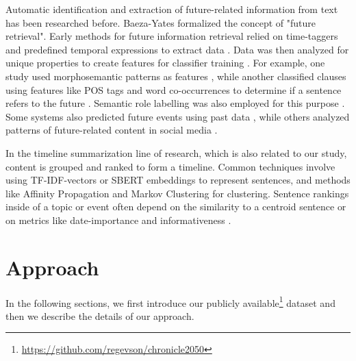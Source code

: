 \documentclass[sigconf]{acmart}
\begin{document}
Automatic identification and extraction of future-related information from text has been researched before. 
Baeza-Yates \cite{BaezaYatesSearchingTF} formalized the concept of "future retrieval". Early methods for future information retrieval relied on time-taggers and predefined temporal expressions to extract data \cite{chronoseeker, supportingAnalysis,  rankingRelated, extractingCollective}. Data was then analyzed for unique properties \cite{improvingRetrieval} to create features for classifier training \cite{computationalExploration}.
For example, one study used morphosemantic patterns as features \cite{automaticExtraction}, while another classified clauses using features like POS tags and word co-occurrences to determine if a sentence refers to the future \cite{extractingPredictive}. Semantic role labelling was also employed for this purpose \cite{DBLP:journals/ieicet/NakajimaPHM16}. Some systems also predicted future events using past data \cite{miningTheWeb, predictingTheNews}, while others analyzed patterns of future-related content in social media \cite{jatowt2015mapping}. %

In the timeline summarization line of research, which is also related to our study, content is grouped and ranked to form a timeline. Common techniques involve using TF-IDF-vectors or SBERT embeddings \cite{sbert} to represent sentences, and methods like Affinity Propagation \cite{abstractiveTimeline, multiTimeline} and Markov Clustering \cite{stateOfTheArtTimeline} for clustering. Sentence rankings inside of a topic or event often depend on the similarity to a centroid sentence \cite{stateOfTheArtTimeline} or on metrics like date-importance and informativeness \cite{abstractiveTimeline}.



\section{Approach}
In the following sections, we first introduce our publicly available\footnote{\url{https://github.com/regevson/chronicle2050}} dataset and then we describe the details of our approach.
\end{document}
